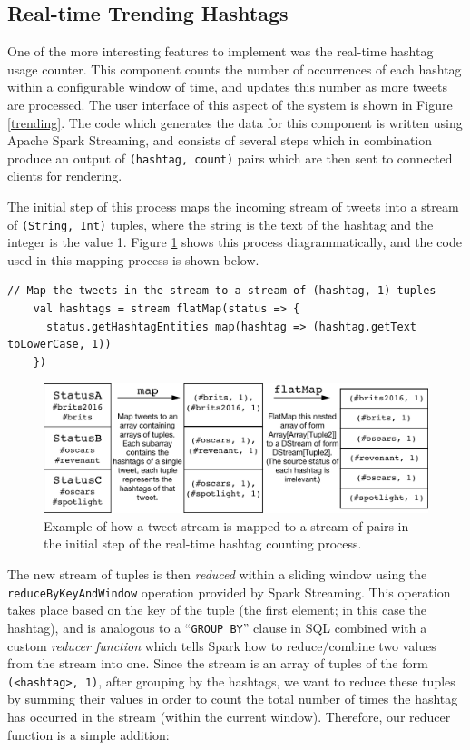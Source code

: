 \documentclass{l4proj}
\newcommand{\code}[1]{\texttt{#1}}
\begin{document}
\subsection{Real-time Trending Hashtags}

One of the more interesting features to implement was the real-time hashtag usage counter. This component counts the number of occurrences of each hashtag within a configurable window of time, and updates this number as more tweets are processed. The user interface of this aspect of the system is shown in Figure \ref{trending}. The code which generates the data for this component is written using Apache Spark Streaming, and consists of several steps which in combination produce an output of \code{(hashtag, count)} pairs which are then sent to connected clients for rendering.

The initial step of this process maps the incoming stream of tweets into a stream of \code{(String, Int)} tuples, where the string is the text of the hashtag and the integer is the value 1. Figure \ref{mappingstep} shows this process diagrammatically, and the code used in this mapping process is shown below.

\begin{lstlisting}[caption=Initial mapping of tweets to hashtags pairs.]
    // Map the tweets in the stream to a stream of (hashtag, 1) tuples
    val hashtags = stream flatMap(status => {
      status.getHashtagEntities map(hashtag => (hashtag.getText toLowerCase, 1))
    })
\end{lstlisting}

\begin{figure}
\centering
\includegraphics[scale=0.75]{mappingstep.pdf}
\caption{Example of how a tweet stream is mapped to a stream of pairs in the initial step of the real-time hashtag counting process.}
\label{mappingstep}
\end{figure}
               
The new stream of tuples is then \textit{reduced} within a sliding window using the \code{reduceByKeyAndWindow} operation provided by Spark Streaming. This operation takes place based on the key of the tuple (the first element; in this case the hashtag), and is analogous to a ``\code{GROUP BY}'' clause in SQL combined with a custom \textit{reducer function} which tells Spark how to reduce/combine two values from the stream into one. Since the stream is an array of tuples of the form \code{(<hashtag>, 1)}, after grouping by the hashtags, we want to reduce these tuples by summing their values in order to count the total number of times the hashtag has occurred in the stream (within the current window). Therefore, our reducer function is a simple addition:
\end{document}
